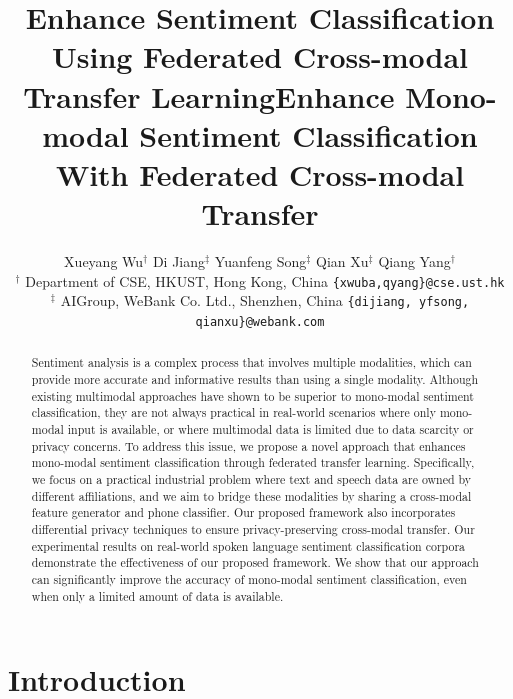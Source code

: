 \documentclass[11pt]{article}
\title{Enhance Sentiment Classification Using Federated Cross-modal Transfer Learning}
\author{Xueyang Wu$^{\dagger}$
\hspace{2em} Di  Jiang$^{\ddagger}$ 
\hspace{2em} Yuanfeng Song$^{\ddagger}$ 
\hspace{2em} Qian Xu$^{\ddagger}$ 
\hspace{2em} Qiang Yang$^{\dagger}$ \\
$^{\dagger}$ Department of CSE, HKUST, Hong Kong, China \hspace{1em}
\texttt{\small\{xwuba,qyang\}@cse.ust.hk}\\
$^{\ddagger}$ AIGroup, WeBank Co. Ltd., Shenzhen, China \hspace{1em} \texttt{\small \{dijiang, yfsong, qianxu\}@webank.com}}
\begin{document}
\title{Enhance Mono-modal Sentiment Classification With Federated Cross-modal Transfer}


\maketitle

\begin{abstract}
Sentiment analysis is a complex process that involves multiple modalities, which can provide more accurate and informative results than using a single modality. Although existing multimodal approaches have shown to be superior to mono-modal sentiment classification, they are not always practical in real-world scenarios where only mono-modal input is available, or where multimodal data is limited due to data scarcity or privacy concerns. To address this issue, we propose a novel approach that enhances mono-modal sentiment classification through federated transfer learning. Specifically, we focus on a practical industrial problem where text and speech data are owned by different affiliations, and we aim to bridge these modalities by sharing a cross-modal feature generator and phone classifier. Our proposed framework also incorporates differential privacy techniques to ensure privacy-preserving cross-modal transfer. Our experimental results on real-world spoken language sentiment classification corpora demonstrate the effectiveness of our proposed framework. We show that our approach can significantly improve the accuracy of mono-modal sentiment classification, even when only a limited amount of data is available.
\end{abstract}



\section{Introduction}\label{sec:introduction}
\end{document}
